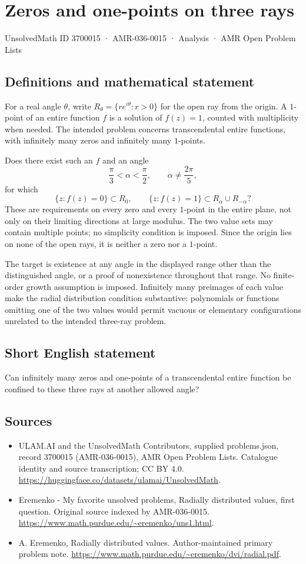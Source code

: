 \documentclass[11pt,a4paper]{article}
\begin{document}
\section*{Zeros and one-points on three rays}\label{3700015}
{\small UnsolvedMath ID 3700015 · AMR-036-0015 · Analysis · AMR Open Problem Lists}
\subsection{Definitions and mathematical statement}
For a real angle $\theta$, write
$R_\theta=\{re^{i\theta}:r>0\}$ for the open ray from
the origin. A $1$-point of an entire function $f$ is a
solution of $f(z)=1$, counted with multiplicity when needed.
The intended problem concerns transcendental entire functions,
with infinitely many zeros and infinitely many $1$-points.

Does there exist such an $f$ and an angle
\[
       \frac{\pi}{3}<\alpha<\frac{\pi}{2},
                   \qquad\alpha\ne\frac{2\pi}{5},
\]
for which
\[
 \{z:f(z)=0\}\subset R_0,\qquad
 \{z:f(z)=1\}\subset R_\alpha\cup R_{-\alpha}?
\]
These are requirements on every zero and every $1$-point
in the entire plane, not only on their limiting directions
at large modulus. The two value sets may contain multiple
points; no simplicity condition is imposed. Since the
origin lies on none of the open rays, it is neither a
zero nor a $1$-point.

The target is existence at any angle in the displayed
range other than the distinguished angle, or a proof of
nonexistence throughout that range. No finite-order growth
assumption is imposed. Infinitely many preimages of each
value make the radial distribution condition substantive:
polynomials or functions omitting one of the two values
would permit vacuous or elementary configurations unrelated
to the intended three-ray problem.
\subsection{Short English statement}
Can infinitely many zeros and one-points of a transcendental entire function be confined to these three rays at another allowed angle?
\subsection{Sources}
\begin{itemize}
\item[S1] ULAM.AI and the UnsolvedMath Contributors, supplied problems.json, record 3700015 (AMR-036-0015), AMR Open Problem Lists. Catalogue identity and source transcription; CC BY 4.0.
\url{https://huggingface.co/datasets/ulamai/UnsolvedMath}.
\item[S2] Eremenko - My favorite unsolved problems, Radially distributed values, first question. Original source indexed by AMR-036-0015.
\url{https://www.math.purdue.edu/~eremenko/uns1.html}.
\item[S3] A. Eremenko, Radially distributed values. Author-maintained primary problem note.
\url{https://www.math.purdue.edu/~eremenko/dvi/radial.pdf}.
\end{itemize}
\end{document}
